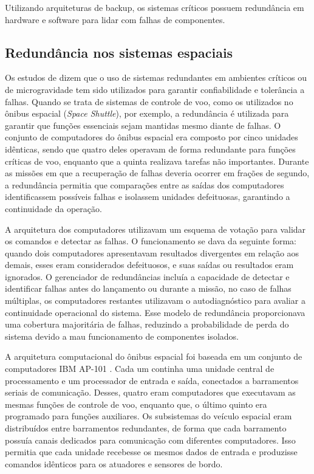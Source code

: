 Utilizando arquiteturas de backup, os sistemas críticos possuem redundância em hardware e software para lidar com falhas de componentes.

\subsection{Redundância nos sistemas espaciais }

Os estudos de \cite{sklaroff1976} dizem que o uso de sistemas redundantes em ambientes críticos ou de microgravidade tem sido utilizados para garantir confiabilidade e tolerância a falhas. Quando se trata de sistemas de controle de voo, como os utilizados no ônibus espacial (\textit{Space Shuttle}), por exemplo, a redundância é utilizada para garantir que funções essenciais sejam mantidas mesmo diante de falhas. O conjunto de computadores do ônibus espacial era composto por cinco unidades idênticas, sendo que quatro deles operavam de forma redundante para funções críticas de voo, enquanto que a quinta realizava tarefas não importantes. Durante as missões em que a recuperação de falhas deveria ocorrer em frações de segundo, a redundância permitia que comparações entre as saídas dos computadores identificassem possíveis falhas e isolassem unidades defeituosas, garantindo a continuidade da operação.

A arquitetura dos computadores utilizavam um esquema de votação para validar os comandos e detectar as falhas. O funcionamento se dava da seguinte forma: quando dois computadores apresentavam resultados divergentes em relação aos demais, esses eram considerados defeituosos, e suas saídas ou resultados eram ignorados. O gerenciador de redundâncias incluía a capacidade de detectar e identificar falhas antes do lançamento ou durante a missão, no caso de falhas múltiplas, os computadores restantes utilizavam o autodiagnóstico para avaliar a continuidade operacional do sistema. Esse modelo de redundância proporcionava uma cobertura majoritária de falhas, reduzindo a probabilidade de perda do sistema devido a mau funcionamento de componentes isolados.

A arquitetura computacional do ônibus espacial foi baseada em um conjunto de computadores IBM AP-101 \cite{ibm_space_shuttle}. Cada um continha uma unidade central de processamento e um processador de entrada e saída, conectados a barramentos seriais de comunicação. Desses, quatro eram computadores que executavam as mesmas funções de controle de voo, enquanto que, o último quinto era programado para funções auxiliares. Os subsistemas do veículo espacial eram distribuídos entre barramentos redundantes, de forma que cada barramento possuía canais dedicados para comunicação com diferentes computadores. Isso permitia que cada unidade recebesse os mesmos dados de entrada e produzisse comandos idênticos para os atuadores e sensores de bordo.

